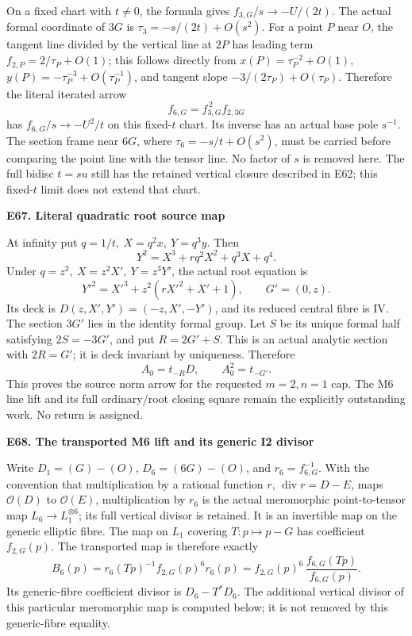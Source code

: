 On a fixed chart with \(t\ne0\), the formula gives
\(f_{3,G}/s\to-U/(2t)\). The actual formal coordinate of \(3G\) is
\(\tau_3=-s/(2t)+O(s^2)\). For a point \(P\) near \(O\), the tangent
line divided by the vertical line at \(2P\) has leading term
\(f_{2,P}=2/\tau_P+O(1)\); this follows directly from
\(x(P)=\tau_P^{-2}+O(1)\), \(y(P)=-\tau_P^{-3}+O(\tau_P^{-1})\),
and tangent slope \(-3/(2\tau_P)+O(\tau_P)\).
Therefore the literal iterated arrow
\[
 f_{6,G}=f_{3,G}^{\,2}f_{2,3G}
\]
has \(f_{6,G}/s\to-U^2/t\) on this fixed-\(t\) chart. Its inverse
has an actual base pole \(s^{-1}\). The section frame near \(6G\),
where \(\tau_6=-s/t+O(s^2)\), must be carried before comparing the
point line with the tensor line. No factor of \(s\) is removed here.
The full bidisc \(t=s u\) still has the retained vertical closure
described in E62; this fixed-\(t\) limit does not extend that chart.

\par

\medskip\noindent\textbf{E67. Literal quadratic root source map}

\par\nobreak

At infinity put \(q=1/t,\ X=q^2x,\ Y=q^3y\). Then
\[
Y^2=X^3+r q^2X^2+q^3X+q^4.
\]
Under \(q=z^2,\ X=z^2X',\ Y=z^3Y'\), the actual root equation is
\[
Y'^2=X'^3+z^2(rX'^2+X'+1),\qquad G'=(0,z).
\]
Its deck is \(D(z,X',Y')=(-z,X',-Y')\), and its reduced central
fibre is IV. The section \(3G'\) lies in the identity formal group.
Let \(S\) be its unique formal half satisfying \(2S=-3G'\), and put
\(R=2G'+S\). This is an actual analytic section with \(2R=G'\);
it is deck invariant by uniqueness. Therefore
\[
 A_0=t_{-R}D,\qquad A_0^2=t_{-G'}.
\]
This proves the source norm arrow for the requested \(m=2,n=1\)
cap. The M6 line lift and its full ordinary/root closing square
remain the explicitly outstanding work. No return is assigned.

\par

\medskip\noindent\textbf{E68. The transported M6 lift and its generic I2 divisor}

\par\nobreak

Write \(D_1=(G)-(O)\), \(D_6=(6G)-(O)\), and
\(r_6=f_{6,G}^{-1}\). With the convention that multiplication by
a rational function \(r\), \(\operatorname{div}r=D-E\), maps
\(\mathcal O(D)\) to \(\mathcal O(E)\), multiplication by \(r_6\)
is the actual meromorphic point-to-tensor map
\(L_6\to L_1^{\otimes6}\); its full vertical divisor is retained.
It is an invertible map on the generic elliptic fibre.
The map on \(L_1\) covering \(T:p\mapsto p-G\) has coefficient
\(f_{2,G}(p)\). The transported map is therefore exactly
\[
 B_6(p)=r_6(Tp)^{-1}f_{2,G}(p)^6r_6(p)
       =f_{2,G}(p)^6\,\frac{f_{6,G}(Tp)}{f_{6,G}(p)}.
 \tag{E68.1}
\]
Its generic-fibre coefficient divisor is \(D_6-T^*D_6\).
The additional vertical divisor of this particular meromorphic map
is computed below; it is not removed by this generic-fibre equality.


